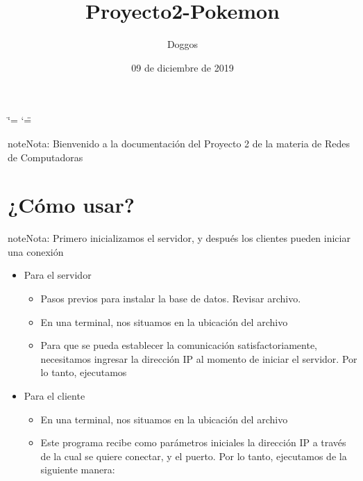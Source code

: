 \documentclass[letterpaper,10pt,spanish,openany,oneside]{sphinxmanual}
\title{Proyecto2-Pokemon}
\date{09 de diciembre de 2019}
\author{Doggos}
\begin{document}
\ifdefined\shorthandoff
  \ifnum\catcode`\=\string=\active\shorthandoff{=}\fi
  \ifnum\catcode`\"=\active{}\fi
\fi

\pagestyle{empty}
\sphinxmaketitle
\pagestyle{plain}
\sphinxtableofcontents
\pagestyle{normal}
\label{\detokenize{index::doc}}


\begin{sphinxadmonition}{note}{Nota:}
Bienvenido a la documentación del Proyecto 2 de la materia de Redes de Computadoras
\end{sphinxadmonition}


\chapter{¿Cómo usar?}
\label{\detokenize{index:como-usar}}
\begin{sphinxadmonition}{note}{Nota:}
Primero inicializamos el servidor, y después los clientes pueden iniciar una conexión
\end{sphinxadmonition}
\begin{itemize}
\item {} 
Para el servidor
\begin{itemize}
\item {} 
Pasos previos para instalar la base de datos. Revisar archivo.

\item {} 
En una terminal, nos situamos en la ubicación del archivo 

\item {} 
Para que se pueda establecer la comunicación satisfactoriamente, necesitamos ingresar la dirección IP al momento de iniciar el servidor. Por lo tanto, ejecutamos 

\end{itemize}

\item {} 
Para el cliente
\begin{itemize}
\item {} 
En una terminal, nos situamos en la ubicación del archivo 

\item {} 
Este programa recibe como parámetros iniciales la dirección IP a través de la cual se quiere conectar, y el puerto. Por lo tanto, ejecutamos de la siguiente manera: 

\end{itemize}

\end{itemize}
\end{document}
